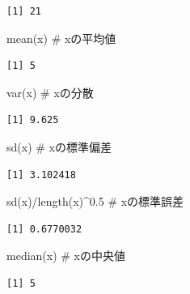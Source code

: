\documentclass[
  letterpaper,
  DIV=11,
  numbers=noendperiod]{scrreprt}
\newenvironment{Shaded}{\begin{snugshade}}{\end{snugshade}}
\newcommand{\CommentTok}[1]{\textcolor[rgb]{0.37,0.37,0.37}{#1}}
\newcommand{\FloatTok}[1]{\textcolor[rgb]{0.68,0.00,0.00}{#1}}
\newcommand{\FunctionTok}[1]{\textcolor[rgb]{0.28,0.35,0.67}{#1}}
\newcommand{\NormalTok}[1]{\textcolor[rgb]{0.00,0.23,0.31}{#1}}
\newcommand{\SpecialCharTok}[1]{\textcolor[rgb]{0.37,0.37,0.37}{#1}}
\begin{document}
\begin{verbatim}
[1] 21
\end{verbatim}

\begin{Shaded}
\begin{Highlighting}[]
\FunctionTok{mean}\NormalTok{(x) }\CommentTok{\# xの平均値}
\end{Highlighting}
\end{Shaded}

\begin{verbatim}
[1] 5
\end{verbatim}

\begin{Shaded}
\begin{Highlighting}[]
\FunctionTok{var}\NormalTok{(x) }\CommentTok{\# xの分散}
\end{Highlighting}
\end{Shaded}

\begin{verbatim}
[1] 9.625
\end{verbatim}

\begin{Shaded}
\begin{Highlighting}[]
\FunctionTok{sd}\NormalTok{(x) }\CommentTok{\# xの標準偏差}
\end{Highlighting}
\end{Shaded}

\begin{verbatim}
[1] 3.102418
\end{verbatim}

\begin{Shaded}
\begin{Highlighting}[]
\FunctionTok{sd}\NormalTok{(x)}\SpecialCharTok{/}\FunctionTok{length}\NormalTok{(x)}\SpecialCharTok{\^{}}\FloatTok{0.5} \CommentTok{\# xの標準誤差}
\end{Highlighting}
\end{Shaded}

\begin{verbatim}
[1] 0.6770032
\end{verbatim}

\begin{Shaded}
\begin{Highlighting}[]
\FunctionTok{median}\NormalTok{(x) }\CommentTok{\# xの中央値}
\end{Highlighting}
\end{Shaded}

\begin{verbatim}
[1] 5
\end{verbatim}
\end{document}
